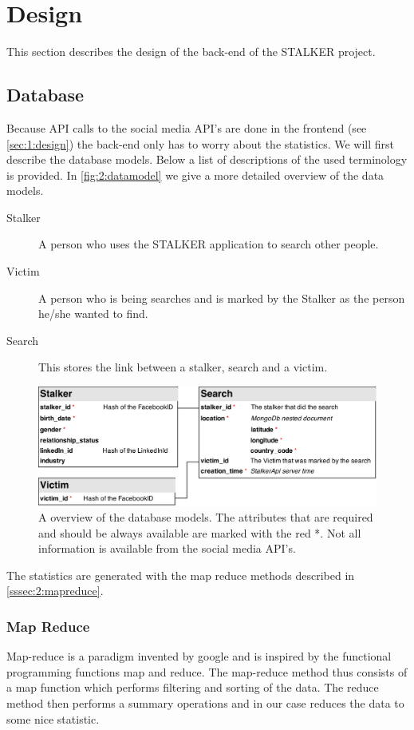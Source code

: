 \section{Design}

This section describes the design of the back-end of the STALKER project. 

\subsection{Database}
Because API calls to the social media API's are done in the frontend (see \autoref{sec:1:design}) the back-end only has to worry about the statistics. We will first describe the database models. Below a list of descriptions of the used terminology is provided. In \autoref{fig:2:datamodel} we give a more detailed overview of the data models.

\begin{description}
\item[Stalker] A person who uses the STALKER application to search other people.
\item[Victim] A person who is being searches and is marked by the Stalker as the person he/she wanted to find.
\item[Search] This stores the link between a stalker, search and a victim.
\end{description}

\begin{figure}
\includegraphics[width=\textwidth]{./img/database_models}   
\caption{A overview of the database models. The attributes that are required and should be always available are marked with the red *. Not all information is available from the social media API's.}
\label{fig:2:datamodel}
\end{figure}

The statistics are generated with the map reduce methods described in \autoref{sssec:2:mapreduce}.

\subsubsection{Map Reduce}
\label{sssec:2:mapreduce}
Map-reduce is a paradigm invented by google and is inspired by the functional programming functions map and reduce. The map-reduce method thus consists of a map function which performs filtering and sorting of the data. The reduce method then performs a summary operations and in our case reduces the data to some nice statistic. 

